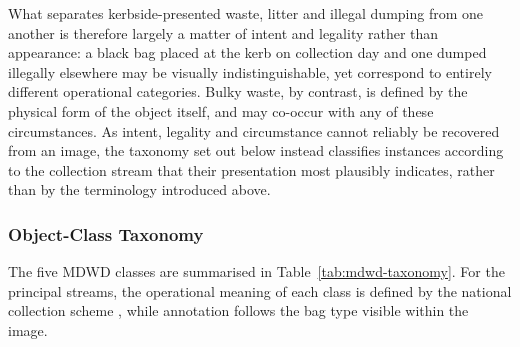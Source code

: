 What separates kerbside-presented waste, litter and illegal dumping from one another is therefore largely a matter of intent and legality rather than appearance: a black bag placed at the kerb on collection day and one dumped illegally elsewhere may be visually indistinguishable, yet correspond to entirely different operational categories. Bulky waste, by contrast, is defined by the physical form of the object itself, and may co-occur with any of these circumstances. As intent, legality and circumstance cannot reliably be recovered from an image, the taxonomy set out below instead classifies instances according to the collection stream that their presentation most plausibly indicates, rather than by the terminology introduced above.

\subsubsection{Object-Class Taxonomy}
\label{sec:bg-mdwd-taxonomy}
The five \gls{MDWD} classes are summarised in Table~\ref{tab:mdwd-taxonomy}. For the principal streams, the operational meaning of each class is defined by the national collection scheme \cite{wastecollection2026web,era2023web}, while annotation follows the bag type visible within the image.

